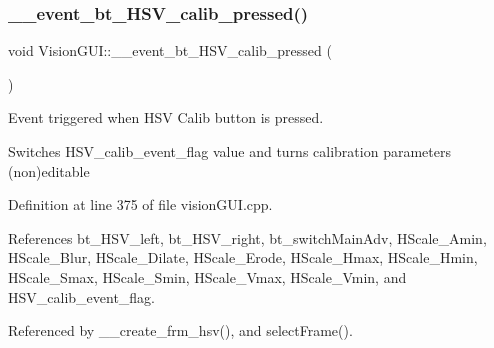 \subsubsection{\texorpdfstring{\+\_\+\+\_\+event\+\_\+bt\+\_\+\+H\+S\+V\+\_\+calib\+\_\+pressed()}{\_\_event\_bt\_HSV\_calib\_pressed()}}
{\footnotesize\ttfamily void Vision\+G\+U\+I\+::\+\_\+\+\_\+event\+\_\+bt\+\_\+\+H\+S\+V\+\_\+calib\+\_\+pressed (\begin{DoxyParamCaption}{ }\end{DoxyParamCaption})\hspace{0.3cm}{\ttfamily [private]}}



Event triggered when H\+SV Calib button is pressed. 

Switches H\+S\+V\+\_\+calib\+\_\+event\+\_\+flag value and turns calibration parameters (non)editable 

Definition at line 375 of file vision\+G\+U\+I.\+cpp.



References bt\+\_\+\+H\+S\+V\+\_\+left, bt\+\_\+\+H\+S\+V\+\_\+right, bt\+\_\+switch\+Main\+Adv, H\+Scale\+\_\+\+Amin, H\+Scale\+\_\+\+Blur, H\+Scale\+\_\+\+Dilate, H\+Scale\+\_\+\+Erode, H\+Scale\+\_\+\+Hmax, H\+Scale\+\_\+\+Hmin, H\+Scale\+\_\+\+Smax, H\+Scale\+\_\+\+Smin, H\+Scale\+\_\+\+Vmax, H\+Scale\+\_\+\+Vmin, and H\+S\+V\+\_\+calib\+\_\+event\+\_\+flag.



Referenced by \+\_\+\+\_\+create\+\_\+frm\+\_\+hsv(), and select\+Frame().


